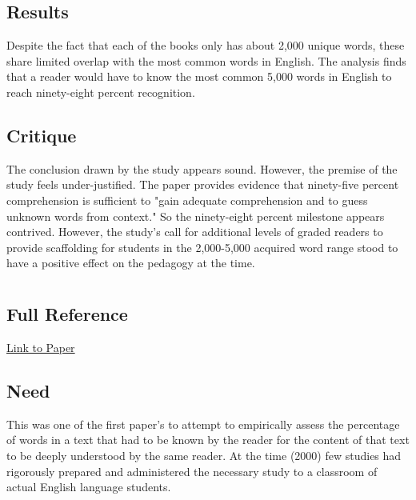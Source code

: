 \documentclass[
	letterpaper, %
]{jdf}
\begin{document}
\subsection{Results}
Despite the fact that each of the books only has about 2,000 unique words, these share limited overlap with the most common words in English. The analysis finds that a reader would have to know the most common 5,000 words in English to reach ninety-eight percent recognition.

\subsection{Critique}
The conclusion drawn by the study appears sound. However, the premise of the study feels under-justified. The paper provides evidence that ninety-five percent comprehension is sufficient to "gain adequate comprehension and to guess unknown words from context." So the ninety-eight percent milestone appears contrived. However, the study's call for additional levels of graded readers to provide scaffolding for students in the 2,000-5,000 acquired word range stood to have a positive effect on the pedagogy at the time.

\section{\cite{hu_2000}}
\subsection{Full Reference}

\href{https://scholarspace.manoa.hawaii.edu/server/api/core/bitstreams/c5873d5c-23b5-41d1-99a5-fde539883ceb/content}{Link to Paper}
\subsection{Need}
This was one of the first paper's to attempt to empirically assess the percentage of words in a text that had to be known by the reader for the content of that text to be deeply understood by the same reader. At the time (2000) few studies had rigorously prepared and administered the necessary study to a classroom of actual English language students.
\end{document}
